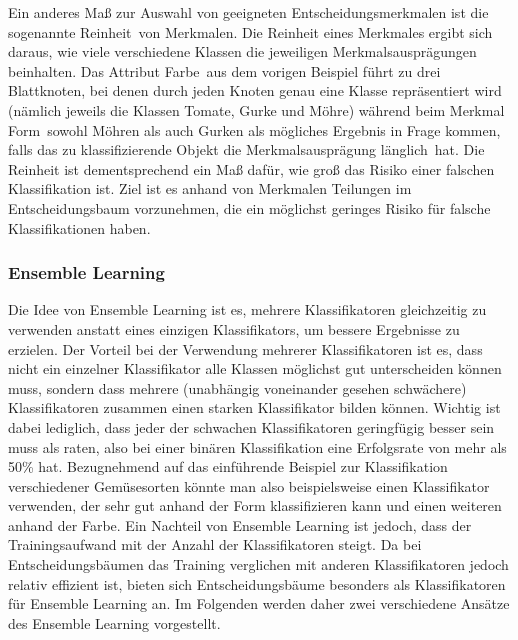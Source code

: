Ein anderes Maß zur Auswahl von geeigneten Entscheidungsmerkmalen ist die sogenannte \glqq Reinheit\grqq\ von Merkmalen. Die Reinheit eines Merkmales ergibt sich daraus, wie viele verschiedene Klassen die jeweiligen Merkmalsausprägungen beinhalten. Das Attribut \glqq Farbe\grqq\ aus dem vorigen Beispiel führt zu drei Blattknoten, bei denen durch jeden Knoten genau eine Klasse repräsentiert wird (nämlich jeweils die Klassen Tomate, Gurke und Möhre) während beim Merkmal \glqq Form\grqq\ sowohl Möhren als auch Gurken als mögliches Ergebnis in Frage kommen, falls das zu klassifizierende Objekt die Merkmalsausprägung \glqq länglich\grqq\ hat. Die Reinheit ist dementsprechend ein Maß dafür, wie groß das Risiko einer falschen Klassifikation ist. Ziel ist es anhand von Merkmalen Teilungen im Entscheidungsbaum vorzunehmen, die ein möglichst geringes Risiko für falsche Klassifikationen haben.


\subsubsection*{Ensemble Learning}
Die Idee von Ensemble Learning ist es, mehrere Klassifikatoren gleichzeitig zu verwenden anstatt eines einzigen Klassifikators, um bessere Ergebnisse zu erzielen. Der Vorteil bei der Verwendung mehrerer Klassifikatoren ist es, dass nicht ein einzelner Klassifikator alle Klassen möglichst gut unterscheiden können muss, sondern dass mehrere (unabhängig voneinander gesehen schwächere) Klassifikatoren zusammen einen starken Klassifikator bilden können. Wichtig ist dabei lediglich, dass jeder der schwachen Klassifikatoren geringfügig besser sein muss als raten, also bei einer binären Klassifikation eine Erfolgsrate von mehr als 50\% hat.
Bezugnehmend auf das einführende Beispiel zur Klassifikation verschiedener Gemüsesorten könnte man also beispielsweise einen Klassifikator verwenden, der sehr gut anhand der Form klassifizieren kann und einen weiteren anhand der Farbe. Ein Nachteil von Ensemble Learning ist jedoch, dass der Trainingsaufwand mit der Anzahl der Klassifikatoren steigt. Da bei Entscheidungsbäumen das Training verglichen mit anderen Klassifikatoren jedoch relativ effizient ist, bieten sich Entscheidungsbäume besonders als Klassifikatoren für Ensemble Learning an. Im Folgenden werden daher zwei verschiedene Ansätze des Ensemble Learning vorgestellt.


